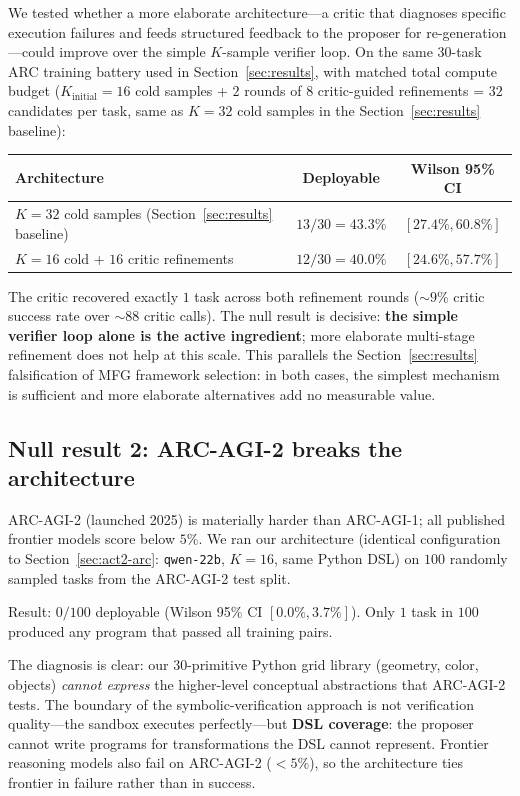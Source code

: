 \documentclass[11pt]{amsart}
\newcommand\1{{\mathds{1}}}
\theoremstyle{definition}
\theoremstyle{remark}
\numberwithin{equation}{section}
\begin{document}
We tested whether a more elaborate architecture---a critic that diagnoses specific execution failures and feeds structured feedback to the proposer for re-generation---could improve over the simple $K$-sample verifier loop.
On the same $30$-task ARC training battery used in Section~\ref{sec:results}, with matched total compute budget ($K_\text{initial}\!=\!16$ cold samples + $2$ rounds of $8$ critic-guided refinements = $32$ candidates per task, same as $K\!=\!32$ cold samples in the Section~\ref{sec:results} baseline):

\begin{center}\small
\begin{tabular}{lcc}
\toprule
Architecture & Deployable & Wilson 95\% CI \\
\midrule
$K\!=\!32$ cold samples (Section~\ref{sec:results} baseline) & $13/30 = 43.3\%$ & $[27.4\%, 60.8\%]$ \\
$K\!=\!16$ cold + $16$ critic refinements & $12/30 = 40.0\%$ & $[24.6\%, 57.7\%]$ \\
\bottomrule
\end{tabular}
\end{center}

The critic recovered exactly $1$ task across both refinement rounds ($\sim\!9\%$ critic success rate over $\sim\!88$ critic calls).
The null result is decisive: \textbf{the simple verifier loop alone is the active ingredient}; more elaborate multi-stage refinement does not help at this scale.
This parallels the Section~\ref{sec:results} falsification of MFG framework selection: in both cases, the simplest mechanism is sufficient and more elaborate alternatives add no measurable value.

\subsection{Null result 2: ARC-AGI-2 breaks the architecture}\label{sec:act2-arc2}

ARC-AGI-2 (launched 2025) is materially harder than ARC-AGI-1; all published frontier models score below $5\%$.
We ran our architecture (identical configuration to Section~\ref{sec:act2-arc}: \texttt{qwen-22b}, $K\!=\!16$, same Python DSL) on $100$ randomly sampled tasks from the ARC-AGI-2 test split.

Result: $0/100$ deployable (Wilson 95\% CI $[0.0\%, 3.7\%]$).
Only $1$ task in $100$ produced any program that passed all training pairs.

The diagnosis is clear: our $30$-primitive Python grid library (geometry, color, objects) \emph{cannot express} the higher-level conceptual abstractions that ARC-AGI-2 tests.
The boundary of the symbolic-verification approach is not verification quality---the sandbox executes perfectly---but \textbf{DSL coverage}: the proposer cannot write programs for transformations the DSL cannot represent.
Frontier reasoning models also fail on ARC-AGI-2 ($<5\%$), so the architecture ties frontier in failure rather than in success.
\end{document}
